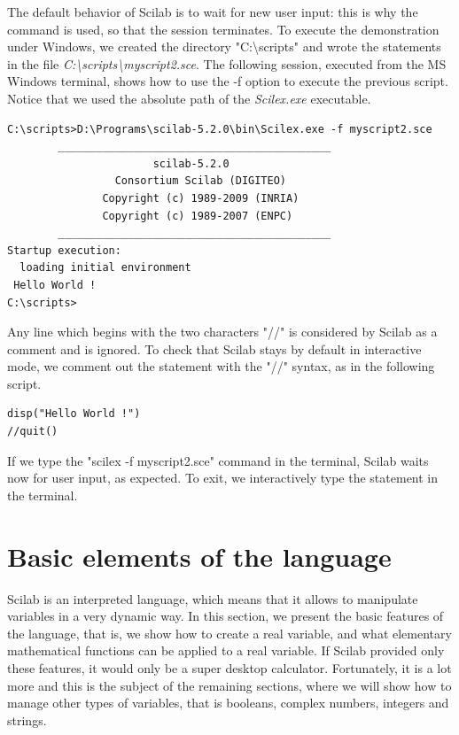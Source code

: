 The default behavior of Scilab is to wait for new user input: 
this is why the  command is used, so that the 
session terminates.
To execute the demonstration under Windows, we created the directory "C:\textbackslash scripts"
and wrote the statements in the file 
\emph{C:\textbackslash scripts\textbackslash myscript2.sce}.
The following session, executed from the MS Windows terminal, 
shows how to use the -f option to execute the previous script.
Notice that we used the absolute path of the \emph{Scilex.exe} executable.
\begin{lstlisting}
C:\scripts>D:\Programs\scilab-5.2.0\bin\Scilex.exe -f myscript2.sce
        ___________________________________________
                       scilab-5.2.0
                 Consortium Scilab (DIGITEO)
               Copyright (c) 1989-2009 (INRIA)
               Copyright (c) 1989-2007 (ENPC)
        ___________________________________________
Startup execution:
  loading initial environment
 Hello World !
C:\scripts>
\end{lstlisting}

Any line which begins with the two characters "//" is considered
by Scilab as a comment and is ignored.
To check that Scilab stays by default in interactive mode, we comment out 
the  statement with the "//" syntax, as in the following 
script.
\lstset{language=scilabscript}
\begin{lstlisting}
disp("Hello World !")
//quit()
\end{lstlisting}

If we type the "scilex -f myscript2.sce" command in the terminal, 
Scilab waits now for user input, as expected. To exit, we 
interactively type the  statement in the 
terminal.


\section{Basic elements of the language}

Scilab is an interpreted language, which means  
that it allows to manipulate variables in a very 
dynamic way. In this section, we present the basic 
features of the language, that is, we show how to create a real variable,
and what elementary mathematical functions 
can be applied to a real variable. If Scilab provided only these
features, it would only be a super desktop calculator. 
Fortunately, it is a lot more and this is the subject of the remaining
sections, where we will show how to manage other 
types of variables, that is booleans, complex numbers, integers
and strings.

